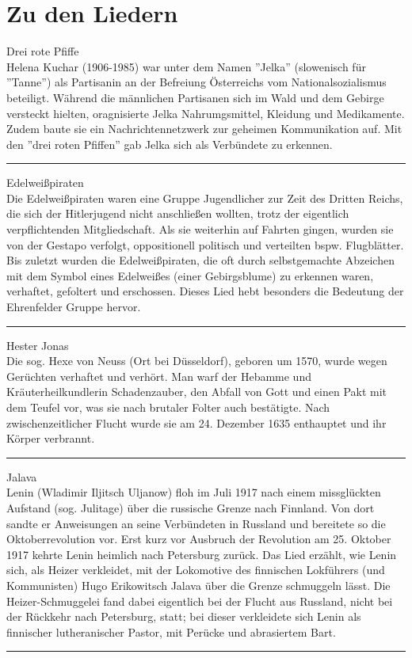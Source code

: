 \section*{Zu den Liedern}


Drei rote Pfiffe\\[+0.2em]
Helena Kuchar (1906-1985) war unter dem Namen ''Jelka'' (slowenisch für ''Tanne'') als Partisanin an der Befreiung Österreichs vom Nationalsozialismus beteiligt.
Während die männlichen Partisanen sich im Wald und dem Gebirge versteckt hielten, oragnisierte Jelka Nahrumgsmittel, Kleidung und Medikamente.
Zudem baute sie ein Nachrichtennetzwerk zur geheimen Kommunikation auf. Mit den ''drei roten Pfiffen'' gab Jelka sich als Verbündete zu erkennen.\\
\noindent\rule{\textwidth}{0.3pt}\vspace{0.5em}

Edelweißpiraten\\[+0.2em]
Die Edelweißpiraten waren eine Gruppe Jugendlicher zur Zeit des Dritten Reichs, die sich der Hitlerjugend nicht anschließen wollten, trotz der eigentlich verpflichtenden Mitgliedschaft.
Als sie weiterhin auf Fahrten gingen, wurden sie von der Gestapo verfolgt, oppositionell politisch und verteilten bspw. Flugblätter.
Bis zuletzt wurden die Edelweißpiraten, die oft durch selbstgemachte Abzeichen mit dem Symbol eines Edelweißes (einer Gebirgsblume) zu erkennen waren, verhaftet, gefoltert und erschossen.
Dieses Lied hebt besonders die Bedeutung der Ehrenfelder Gruppe hervor.\\
\noindent\rule{\textwidth}{0.3pt}\vspace{0.5em}

Hester Jonas\\[+0.2em]
Die sog. Hexe von Neuss (Ort bei Düsseldorf), geboren um 1570, wurde wegen Gerüchten verhaftet und verhört.
Man warf der Hebamme und Kräuterheilkundlerin Schadenzauber, den Abfall von Gott und einen Pakt mit dem Teufel vor, was sie nach brutaler Folter auch bestätigte.
Nach zwischenzeitlicher Flucht wurde sie am 24. Dezember 1635 enthauptet und ihr Körper verbrannt.\\
\noindent\rule{\textwidth}{0.3pt}\vspace{0.5em}

Jalava\\[+0.2em]
Lenin (Wladimir Iljitsch Uljanow) floh im Juli 1917 nach einem missglückten Aufstand (sog. Julitage) über die russische Grenze nach Finnland.
Von dort sandte er Anweisungen an seine Verbündeten in Russland und bereitete so die Oktoberrevolution vor.
Erst kurz vor Ausbruch der Revolution am 25. Oktober 1917 kehrte Lenin heimlich nach Petersburg zurück.
Das Lied erzählt, wie Lenin sich, als Heizer verkleidet, mit der Lokomotive des finnischen Lokführers (und Kommunisten) Hugo Erikowitsch Jalava über die Grenze schmuggeln lässt.
Die Heizer-Schmuggelei fand dabei eigentlich bei der Flucht aus Russland, nicht bei der Rückkehr nach Petersburg, statt; bei dieser verkleidete sich Lenin als finnischer lutheranischer Pastor, mit Perücke und abrasiertem Bart.\\
\noindent\rule{\textwidth}{0.3pt}\vspace{0.5em}
